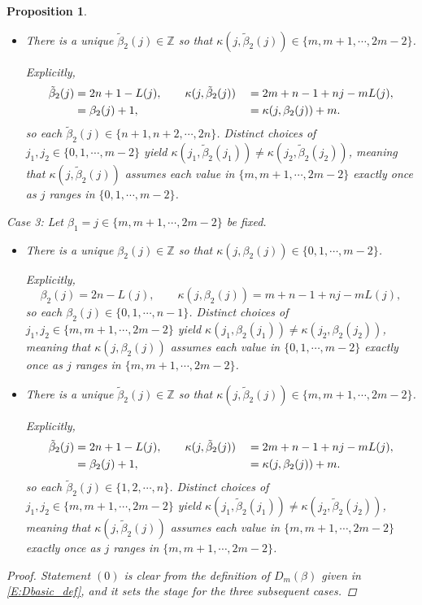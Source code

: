 \documentclass[10pt,a4paper]{amsart}
\newtheorem{proposition}{Proposition}
\newcommand{\Z}{{\mathbb Z}}
\begin{document}
\begin{proposition}
\begin{itemize}
\item[(2b)] 
There is a unique $\tilde{\beta}_2(j) \in \Z$ so that $\kappa(j,\tilde\beta_2(j)) \in \{m,m+1,\cdots, 2m-2 \}$.

Explicitly, 
\begin{alignat}{2}
\tilde\beta_2(j) &= 2n + 1 - L(j), \qquad \kappa(j,\tilde\beta_2(j)) &&= 2m + n -1 + nj - m L(j), \\
 &= \beta_2(j) + 1, \qquad &&= \kappa(j,\beta_2(j)) + m. \notag
\end{alignat}
so each $\tilde\beta_2(j) \in \{n+1,n+2, \cdots, 2n \}$.
Distinct choices of $j_1,j_2 \in \{0,1,\cdots,m-2 \}$ yield $\kappa(j_1,\tilde\beta_2(j_1)) \neq \kappa(j_2,\tilde\beta_2(j_2))$, meaning that $\kappa(j,\tilde\beta_2(j))$ assumes each value in $\{m,m+1,\cdots,2m-2 \}$ exactly once as $j$ ranges in $\{0,1,\cdots,m-2 \}$.
\end{itemize}

\noindent  Case 3: Let $\beta_1 = j \in \{m,m+1,\cdots,2m-2 \}$ be fixed.

\begin{itemize}

\item[(3a)] 
There is a unique $\beta_2(j) \in \Z$ so that $\kappa(j,\beta_2(j)) \in \{0,1,\cdots,m-2 \}$.

Explicitly, 
\begin{equation}
\beta_2(j) = 2n - L(j), \qquad \kappa(j,\beta_2(j)) = m + n -1 + nj - m L(j),
\end{equation}
so each $\beta_2(j) \in \{0,1, \cdots, n-1 \}$.
Distinct choices of $j_1,j_2 \in \{m,m+1,\cdots,2m-2 \}$ yield $\kappa(j_1,\beta_2(j_1)) \neq \kappa(j_2,\beta_2(j_2))$, meaning that $\kappa(j,\beta_2(j))$ assumes each value in $\{0,1,\cdots,m-2 \}$ exactly once as $j$ ranges in $\{m,m+1,\cdots,2m-2 \}$.

\item[(3b)] 
There is a unique $\tilde{\beta}_2(j) \in \Z$ so that $\kappa(j,\tilde\beta_2(j)) \in \{m,m+1,\cdots, 2m-2 \}$.

Explicitly, 
\begin{alignat}{2}
\tilde\beta_2(j) &= 2n + 1 - L(j), \qquad \kappa(j,\tilde\beta_2(j)) &&= 2m + n -1 + nj - m L(j), \\
 &= \beta_2(j) + 1, \qquad &&= \kappa(j,\beta_2(j)) + m. \notag
\end{alignat}
so each $\tilde\beta_2(j) \in \{1,2, \cdots, n \}$.
Distinct choices of $j_1,j_2 \in \{m,m+1,\cdots,2m-2 \}$ yield $\kappa(j_1,\tilde\beta_2(j_1)) \neq \kappa(j_2,\tilde\beta_2(j_2))$, meaning that $\kappa(j,\tilde\beta_2(j))$ assumes each value in $\{m,m+1,\cdots,2m-2 \}$ exactly once as $j$ ranges in $\{m,m+1,\cdots,2m-2 \}$.
\end{itemize}
\begin{proof}
Statement $(0)$ is clear from the definition of $D_m(\beta)$ given in \eqref{E:Dbasic_def}, and it sets the stage for the three subsequent cases.


\end{proof}
\end{proposition}
\end{document}
